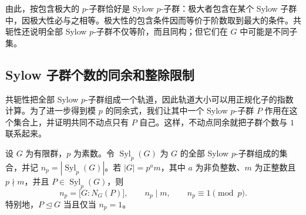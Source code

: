 由此，按包含极大的 \(p\)-子群恰好是 Sylow \(p\)-子群：极大者包含在某个 Sylow 子群中，因极大性必与之相等。极大性的包含条件因而等价于阶数取到最大的条件。共轭性还说明全部 Sylow \(p\)-子群不仅等阶，而且同构；但它们在 \(G\) 中可能是不同子集。

\subsection{Sylow 子群个数的同余和整除限制}
\label{b1:subsec:0502:02}

共轭性把全部 Sylow \(p\)-子群组成一个轨道，因此轨道大小可以用正规化子的指数计算。为了进一步得到模 \(p\) 的同余式，我们让其中一个 Sylow \(p\)-子群 \(P\) 作用在这个集合上，并证明共同不动点只有 \(P\) 自己。这样，不动点同余就把子群个数与 \(1\) 联系起来。

\begin{theorem}\label{b1:thm:sylow-count}
	设 \(G\) 为有限群，\(p\) 为素数。令 \(\operatorname{Syl}_p(G)\) 为 \(G\) 的全部 Sylow \(p\)-子群组成的集合，并记 \(n_p=|\operatorname{Syl}_p(G)|\)。若 \(|G|=p^am\)，其中 \(a\) 为非负整数、\(m\) 为正整数且 \(p\nmid m\)，并且 \(P\in\operatorname{Syl}_p(G)\)，则
	\[
		n_p=\bigl[G:N_G(P)\bigr],\qquad n_p\mid m,\qquad n_p\equiv1\pmod p.
	\]
	特别地，\(P\trianglelefteq G\) 当且仅当 \(n_p=1\)。
\end{theorem}

